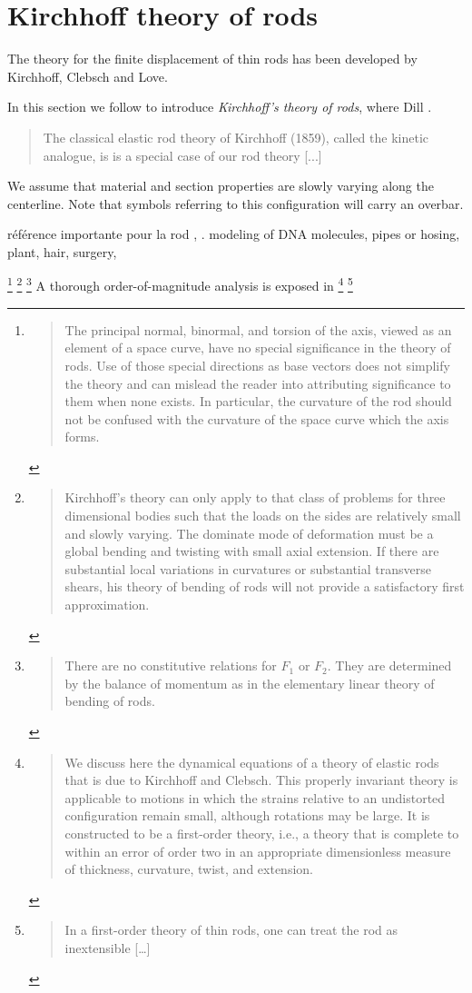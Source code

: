 \clearpage
\section{Kirchhoff theory of rods}

The theory for the finite displacement of thin rods has been developed by Kirchhoff, Clebsch and Love.

In this section we follow \cite{Dill1992} to introduce \emph{Kirchhoff's theory of rods}, where Dill . \blockcquote[p.~238]{Antman2005}{The classical elastic rod theory of Kirchhoff (1859), called the kinetic analogue, is is a special case of our rod theory [...]}

We assume that material and section properties are slowly varying along the centerline.
Note that symbols referring to this configuration will carry an overbar.

référence importante pour la rod \cite{Moulton2013} , \cite[p.~109]{Villaggio1997}.
modeling of DNA molecules, pipes or hosing, plant, hair, surgery, 

\footnote{\blockcquote[p.~5]{Dill1992}{The principal normal, binormal, and torsion of the axis, viewed as an element of a space curve, have no special significance in the theory of rods. Use of those special directions as base vectors does not simplify the theory and can mislead the reader into attributing significance to them when none exists. In particular, the curvature of the rod should not be confused with the curvature of the space curve which the axis forms.}}
\footnote{\blockcquote[p.~18]{Dill1992}{Kirchhoff's theory can only apply to that class of problems for three dimensional bodies such that the loads on the sides are relatively small and slowly varying. The dominate mode of deformation must be a global bending and twisting with small axial extension. If there are substantial local variations in curvatures or substantial transverse shears, his theory of bending of rods will not provide a satisfactory first approximation.}}
\footnote{\blockcquote[p.~15]{Dill1992}{There are no constitutive relations for $F_1$ or $F_2$. They are determined by the balance of momentum as in the elementary linear theory of bending of rods.}}
A thorough order-of-magnitude analysis is exposed in \cite{Dill1992, Coleman1993}
\footnote{\blockcquote[p.~1]{Coleman1993}{We discuss here the dynamical equations of a theory of elastic rods that is due to Kirchhoff and Clebsch. This properly invariant theory is applicable to motions in which the strains relative to an undistorted configuration remain small, although rotations may be large. It is constructed to be a first-order theory, i.e., a theory that is complete to within an error of order two in an appropriate dimensionless measure of thickness, curvature, twist, and extension.}}
\footnote{\blockcquote[p.~1]{Coleman1993}{In a first-order theory of thin rods, one can treat the rod as inextensible [\dots]}}


